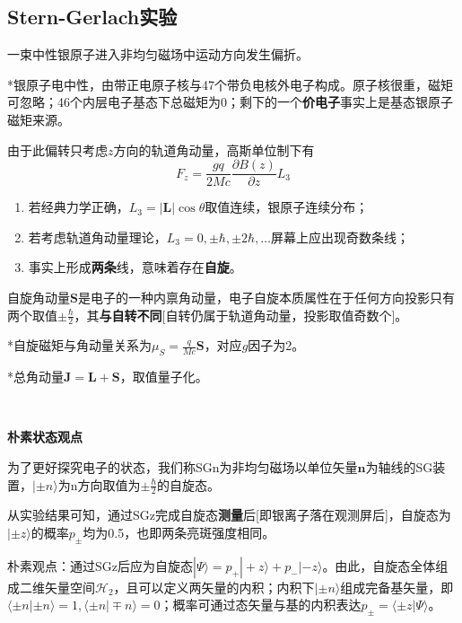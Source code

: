 \documentclass[a4paper,UTF8,fontset=windows]{ctexart}
\newcommand*{\ket}[1]{|#1\rangle}
\newcommand*{\bk}[2]{\langle#1|#2\rangle}
\begin{document}
\subsection{Stern-Gerlach实验}
一束中性银原子进入非均匀磁场中运动方向发生偏折。

*银原子电中性，由带正电原子核与47个带负电核外电子构成。原子核很重，磁矩可忽略；46个内层电子基态下总磁矩为0；剩下的一个\textbf{价电子}事实上是基态银原子磁矩来源。

由于此偏转只考虑$z$方向的轨道角动量，高斯单位制下有
$$F_z=\frac{gq}{2Mc}\frac{\partial B(z)}{\partial z}L_3$$

\begin{enumerate}
    \item 若经典力学正确，$L_3=|\mathbf{L}|\cos\theta$取值连续，银原子连续分布；
    \item 若考虑轨道角动量理论，$L_3=0,\pm\hbar,\pm2\hbar,\dots$屏幕上应出现奇数条线；
    \item 事实上形成\textbf{两条}线，意味着存在\textbf{自旋}。
\end{enumerate}

自旋角动量$\mathbf{S}$是电子的一种内禀角动量，电子自旋本质属性在于任何方向投影只有两个取值$\pm\frac{\hbar}{2}$，其\textbf{与自转不同}[自转仍属于轨道角动量，投影取值奇数个]。

*自旋磁矩与角动量关系为$\mu_S=\frac{q}{Mc}\mathbf{S}$，对应$g$因子为2。

*总角动量$\mathbf{J}=\mathbf{L}+\mathbf{S}$，取值量子化。

\

\textbf{朴素状态观点}

为了更好探究电子的状态，我们称SGn为非均匀磁场以单位矢量$\mathbf{n}$为轴线的SG装置，$\ket{\pm n}$为n方向取值为$\pm\frac{\hbar}{2}$的自旋态。

从实验结果可知，通过SGz完成自旋态\textbf{测量}后[即银离子落在观测屏后]，自旋态为$\ket{\pm z}$的概率$p_\pm$均为0.5，也即两条亮斑强度相同。

朴素观点：通过SGz后应为自旋态$\ket{\Psi}=p_+\ket{+z}+p_-\ket{-z}$。由此，自旋态全体组成二维矢量空间$\mathcal{H}_2$，且可以定义两矢量的内积；内积下$\ket{\pm n}$组成完备基矢量，即$\bk{\pm n}{\pm n}=1,\bk{\pm n}{\mp n}=0$；概率可通过态矢量与基的内积表达$p_\pm=\bk{\pm z}{\Psi}$。
\end{document}
